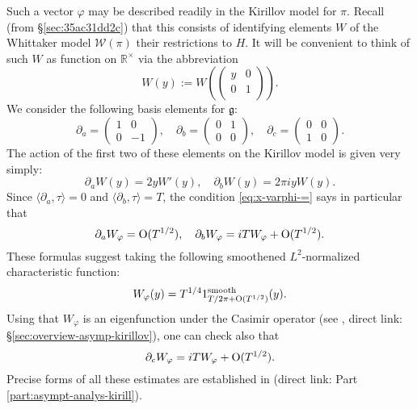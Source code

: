 \documentclass[reqno]{amsart} 
\numberwithin{equation}{section}
\numberwithin{theorem}{section}
\begin{document}
Such a vector $\varphi$ may be described readily in the Kirillov model for $\pi$.  Recall (from \S\ref{sec:35ac31dd2c}) that this consists of identifying elements $W$ of the Whittaker model $\mathcal{W}(\pi)$ their restrictions to $H$.  It will be convenient to think of such $W$ as function on $\mathbb{R}^\times$ via the abbreviation
\begin{equation*}
W(y) := W\left(
  \begin{pmatrix}
y & 0 \\
0 & 1 \\
\end{pmatrix} \right).
\end{equation*}
We consider the following basis elements for $\mathfrak{g}$:
\begin{equation*}
  \partial_a =
  \begin{pmatrix}
    1 & 0 \\
    0 & -1
  \end{pmatrix},
  \quad
  \partial_b =
  \begin{pmatrix}
    0 & 1 \\
    0 & 0
  \end{pmatrix},
  \quad
  \partial_c =
  \begin{pmatrix}
    0 & 0 \\
    1 & 0
  \end{pmatrix}  .
\end{equation*}
The action of the first two of these elements on the Kirillov model is given very simply:
\begin{equation*}
  \partial_a W(y) = 2 y W'(y),
  \quad
  \partial_b W(y) = 2 \pi i y W(y).
\end{equation*}
Since $\langle \partial_a, \tau \rangle = 0$ and $\langle \partial_b, \tau \rangle = T$, the condition \eqref{eq:x-varphi-=} says in particular that
\begin{equation*}
  \partial_a W_\varphi = \operatorname{O}(T^{1/2}),
  \quad
  \partial_b W_\varphi = i T W_\varphi + \operatorname{O}(T^{1/2}).
\end{equation*}
These formulas suggest taking the following smoothened $L^2$-normalized characteristic function:
\begin{equation}\label{eqn:35ac3e31cb}
  W_\varphi(y) = T^{1/4} 1_{T / 2 \pi + \operatorname{O}(T^{1/2})}^{\text{smooth}}(y).
\end{equation}
Using that $W_\varphi$ is an eigenfunction under the Casimir operator (see \cite[\S12]{2021arXiv210915230N}, direct link: \S\ref{sec:overview-asymp-kirillov}), one can check also that
\begin{equation*}
  \partial_c W_\varphi = i T W_\varphi + \operatorname{O}(T^{1/2}).
\end{equation*}
Precise forms of all these estimates are established in \cite[Part 3]{2021arXiv210915230N} (direct link: Part \ref{part:asympt-analys-kirill}).
\end{document}

